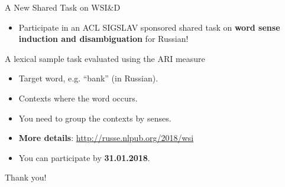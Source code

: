 \documentclass{beamer}
\begin{document}
\begin{frame}{A New Shared Task on WSI\&D}
  
  \begin{itemize}
  \item Participate in an ACL SIGSLAV sponsored shared task on \textbf{word sense induction and disambiguation} for Russian!
  
  
 \end{itemize} 
  
  \begin{block}{A lexical sample task evaluated using the ARI measure }
  \begin{itemize}
  	\item Target word, e.g. ``bank'' (in Russian).
  	\item Contexts where the word occurs.
  	\item You need to group the contexts by senses.
  \end{itemize}
  \end{block}
  
  \pause
  \begin{itemize}
    \item \textbf{More details}: \url{http://russe.nlpub.org/2018/wsi}
  \item You can participate by \textbf{31.01.2018}.
    
  \end{itemize}
  
\end{frame}

\begin{frame}{}
\Huge{Thank you!}
\end{frame}
\end{document}

